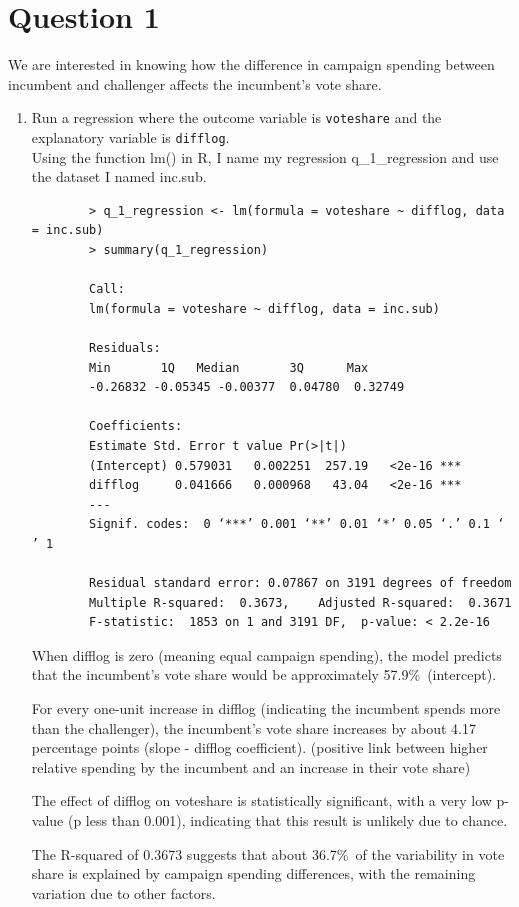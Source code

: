 \documentclass[12pt,letterpaper]{article}
\begin{document}
\section*{Question 1}
\vspace{.25cm}
\noindent We are interested in knowing how the difference in campaign spending between incumbent and challenger affects the incumbent's vote share. 
	\begin{enumerate}
		\item 
		Run a regression where the outcome variable is \texttt{voteshare} and the explanatory variable is \texttt{difflog}.\\ 
		
		\noindent Using the function lm() in R, I name my regression 	q\_1\_regression and use the dataset I named inc.sub.
		\begin{verbatim}
		> q_1_regression <- lm(formula = voteshare ~ difflog, data = inc.sub)
		> summary(q_1_regression)
		
		Call:
		lm(formula = voteshare ~ difflog, data = inc.sub)
		
		Residuals:
		Min       1Q   Median       3Q      Max 
		-0.26832 -0.05345 -0.00377  0.04780  0.32749 
		
		Coefficients:
		Estimate Std. Error t value Pr(>|t|)    
		(Intercept) 0.579031   0.002251  257.19   <2e-16 ***
		difflog     0.041666   0.000968   43.04   <2e-16 ***
		---
		Signif. codes:  0 ‘***’ 0.001 ‘**’ 0.01 ‘*’ 0.05 ‘.’ 0.1 ‘ ’ 1
		
		Residual standard error: 0.07867 on 3191 degrees of freedom
		Multiple R-squared:  0.3673,	Adjusted R-squared:  0.3671 
		F-statistic:  1853 on 1 and 3191 DF,  p-value: < 2.2e-16
	\end{verbatim}
	When difflog is zero (meaning equal campaign spending), the model predicts that the incumbent’s vote share would be approximately 57.9\%\ (intercept).
	
	For every one-unit increase in difflog (indicating the incumbent spends more than the challenger), the incumbent’s vote share increases by about 4.17 percentage points (slope - difflog coefficient). (positive link between higher relative spending by the incumbent and an increase in their vote share)
	
	The effect of difflog on voteshare is statistically significant, with a very low p-value (p less than 0.001), indicating that this result is unlikely due to chance.
	
	The R-squared of 0.3673 suggests that about 36.7\%\ of the variability in vote share is explained by campaign spending differences, with the remaining variation due to other factors.
	

\end{enumerate}
\end{document}
